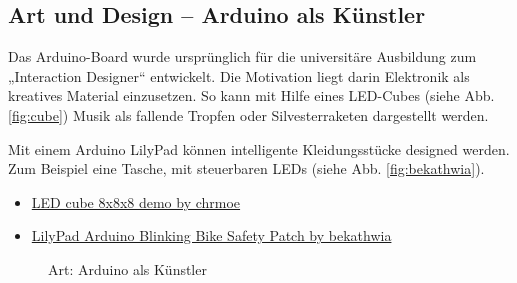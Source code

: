 \subsection{Art und Design -- Arduino als Künstler}

Das Arduino-Board  wurde ursprünglich für die universitäre Ausbildung zum „Interaction Designer“ entwickelt. Die Motivation liegt darin Elektronik als kreatives Material einzusetzen. So kann mit Hilfe eines LED-Cubes (siehe Abb. \ref{fig:cube}) Musik als fallende Tropfen oder Silvesterraketen dargestellt werden. 

Mit einem Arduino LilyPad können intelligente Kleidungsstücke designed werden. Zum Beispiel eine Tasche, mit steuerbaren LEDs (siehe Abb. \ref{fig:bekathwia}).

\begin{itemize}
  \item \href{https://www.youtube.com/watch?v=6mXM-oGggrM}{LED cube 8x8x8 demo by chrmoe}
  \item \href{http://www.instructables.com/id/LilyPad-Arduino-Blinking-Bike-Safety-Patch/}{LilyPad Arduino Blinking Bike Safety Patch
by bekathwia}
\end{itemize}



\begin{figure}[h]
  \qquad
  \label{fig:Art}
  \caption{Art: Arduino als Künstler}
\end{figure}

